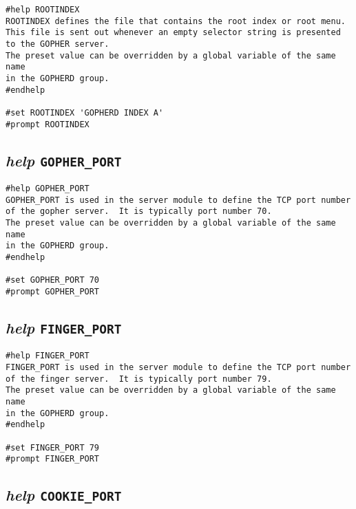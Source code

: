 \begin{verbatim}
#help ROOTINDEX
ROOTINDEX defines the file that contains the root index or root menu.
This file is sent out whenever an empty selector string is presented
to the GOPHER server.
The preset value can be overridden by a global variable of the same name
in the GOPHERD group.
#endhelp

#set ROOTINDEX 'GOPHERD INDEX A'
#prompt ROOTINDEX
\end{verbatim}

\subsection{{\sl{help}} {\tt GOPHER\_PORT}}

\def\LPtopD{{\sl{help}} {\tt GOPHER\_PORT}}

\def\LPtopF{~}

\begin{verbatim}
#help GOPHER_PORT
GOPHER_PORT is used in the server module to define the TCP port number
of the gopher server.  It is typically port number 70.
The preset value can be overridden by a global variable of the same name
in the GOPHERD group.
#endhelp

#set GOPHER_PORT 70
#prompt GOPHER_PORT
\end{verbatim}

\subsection{{\sl{help}} {\tt FINGER\_PORT}}

\def\LPtopD{{\sl{help}} {\tt FINGER\_PORT}}

\def\LPtopF{~}

\begin{verbatim}
#help FINGER_PORT
FINGER_PORT is used in the server module to define the TCP port number
of the finger server.  It is typically port number 79.
The preset value can be overridden by a global variable of the same name
in the GOPHERD group.
#endhelp

#set FINGER_PORT 79
#prompt FINGER_PORT
\end{verbatim}

\subsection{{\sl{help}} {\tt COOKIE\_PORT}}

\def\LPtopD{{\sl{help}} {\tt COOKIE\_PORT}}

\def\LPtopF{~}

